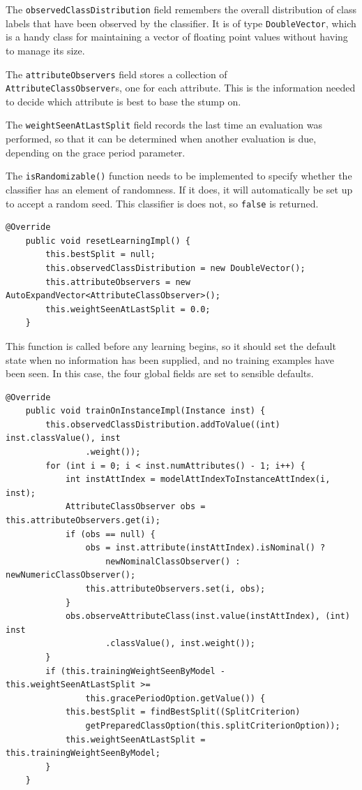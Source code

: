 \documentclass[a4paper,12pt,twoside]{book}
\begin{document}
The \verb+observedClassDistribution+ field remembers the overall distribution of class labels that have been observed by the classifier. It is of type \verb+DoubleVector+, which is a handy class for maintaining a vector of floating point values without having to manage its size.

The \verb+attributeObservers+ field stores a collection of \\ \verb+AttributeClassObserver+s, one for each attribute. This is the information needed to decide which attribute is best to base the stump on.

The \verb+weightSeenAtLastSplit+ field records the last time an evaluation was performed, so that it can be determined when another evaluation is due, depending on the grace period parameter.

The \verb+isRandomizable()+ function needs to be implemented to specify whether the classifier has an element of randomness. If it does, it will automatically be set up to accept a random seed. This classifier is does not, so \verb+false+ is returned.

\begin{lstlisting}[caption={Preparing for learning},label=lst:preplearn,firstnumber=37]
	@Override
	public void resetLearningImpl() {
		this.bestSplit = null;
		this.observedClassDistribution = new DoubleVector();
		this.attributeObservers = new AutoExpandVector<AttributeClassObserver>();
		this.weightSeenAtLastSplit = 0.0;
	}
\end{lstlisting}

This function is called before any learning begins, so it should set the default state when no information has been supplied, and no training examples have been seen. In this case, the four global fields are set to sensible defaults.

\begin{lstlisting}[caption={Training on examples},label=lst:train,firstnumber=45]
	@Override
	public void trainOnInstanceImpl(Instance inst) {
		this.observedClassDistribution.addToValue((int) inst.classValue(), inst
				.weight());
		for (int i = 0; i < inst.numAttributes() - 1; i++) {
			int instAttIndex = modelAttIndexToInstanceAttIndex(i, inst);
			AttributeClassObserver obs = this.attributeObservers.get(i);
			if (obs == null) {
				obs = inst.attribute(instAttIndex).isNominal() ?
					newNominalClassObserver() : newNumericClassObserver();
				this.attributeObservers.set(i, obs);
			}
			obs.observeAttributeClass(inst.value(instAttIndex), (int) inst
					.classValue(), inst.weight());
		}
		if (this.trainingWeightSeenByModel - this.weightSeenAtLastSplit >=
				this.gracePeriodOption.getValue()) {
			this.bestSplit = findBestSplit((SplitCriterion)
				getPreparedClassOption(this.splitCriterionOption));
			this.weightSeenAtLastSplit = this.trainingWeightSeenByModel;
		}
	}
\end{lstlisting}
\end{document}
